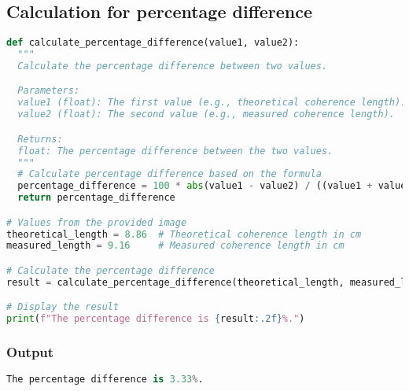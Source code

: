 \documentclass[a4paper,11pt]{article}
\begin{document}
\subsection{Calculation for percentage difference}
\begin{lstlisting}[language=Python]
  def calculate_percentage_difference(value1, value2):
  """
  Calculate the percentage difference between two values.

  Parameters:
  value1 (float): The first value (e.g., theoretical coherence length).
  value2 (float): The second value (e.g., measured coherence length).

  Returns:
  float: The percentage difference between the two values.
  """
  # Calculate percentage difference based on the formula
  percentage_difference = 100 * abs(value1 - value2) / ((value1 + value2) / 2)
  return percentage_difference

# Values from the provided image
theoretical_length = 8.86  # Theoretical coherence length in cm
measured_length = 9.16     # Measured coherence length in cm

# Calculate the percentage difference
result = calculate_percentage_difference(theoretical_length, measured_length)

# Display the result
print(f"The percentage difference is {result:.2f}%.")

\end{lstlisting}
\label{code: Percentage Difference Calculation}

\subsubsection*{Output}
\begin{lstlisting}[language=Python]
The percentage difference is 3.33%.
\end{lstlisting}
\end{document}

